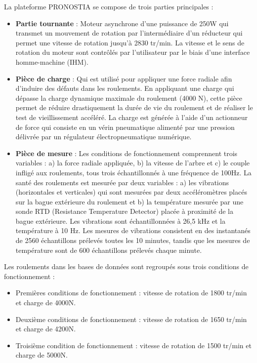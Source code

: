 La plateforme PRONOSTIA se compose de trois parties principales :

\begin{itemize}
	\item \textbf{Partie tournante} : Moteur asynchrone d'une puissance de 250W qui transmet un mouvement de rotation par l'intermédiaire d'un réducteur qui permet une vitesse de rotation jusqu'à 2830 tr/min. La vitesse et le sens de rotation du moteur sont contrôlés par l'utilisateur par le biais d'une interface homme-machine (IHM).
	\item \textbf{Pièce de charge} : Qui est utilisé pour appliquer une force radiale afin d'induire des défauts dans les roulements. En appliquant une charge qui dépasse la charge dynamique maximale du roulement (4000 N), cette pièce permet de réduire drastiquement la durée de vie du roulement et de réaliser le test de vieillissement accéléré. La charge est générée à l'aide d'un actionneur de force qui consiste en un vérin pneumatique alimenté par une pression délivrée par un régulateur électropneumatique numérique.
	\item \textbf{Pièce de mesure} : Les conditions de fonctionnement comprennent trois variables : a) la force radiale appliquée, b) la vitesse de l'arbre et c) le couple infligé aux roulements, tous trois échantillonnés à une fréquence de 100Hz. La santé des roulements est mesurée par deux variables : a) les vibrations (horizontales et verticales) qui sont mesurées par deux accéléromètres placés sur la bague extérieure du roulement et b) la température mesurée par une sonde RTD (Resistance Temperature Detector) placée à proximité de la bague extérieure. Les vibrations sont échantillonnées à 26,5 kHz et la température à 10 Hz. Les mesures de vibrations consistent en des instantanés de 2560 échantillons prélevés toutes les 10 minutes, tandis que les mesures de température sont de 600 échantillons prélevés chaque minute.
\end{itemize}

Les roulements dans les bases de données sont regroupés sous trois conditions de fonctionnement :
\begin{itemize}
	\item Premières conditions de fonctionnement : vitesse de rotation de 1800 tr/min et charge de 4000N.
	\item Deuxième conditions de fonctionnement : vitesse de rotation de 1650 tr/min et charge de 4200N.
	\item Troisième condition de fonctionnement : vitesse de rotation de 1500 tr/min et charge de 5000N.
\end{itemize}


